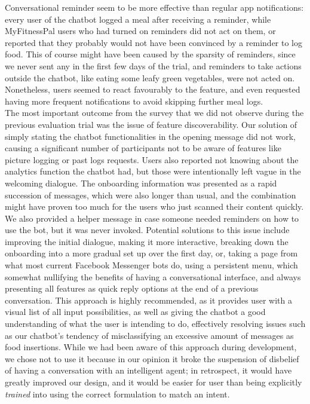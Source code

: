 Conversational reminder seem to be more effective than regular app notifications: every user of the chatbot logged a meal after receiving a reminder, while MyFitnessPal users who had turned on reminders did not act on them, or reported that they probably would not have been convinced by a reminder to log food. This of course might have been caused by the sparsity of reminders, since we never sent any in the first few days of the trial, and reminders to take actions outside the chatbot, like eating some leafy green vegetables, were not acted on. Nonetheless, users seemed to react favourably to the feature, and even requested having more frequent notifications to avoid skipping further meal logs. \\
The most important outcome from the survey that we did not observe during the previous evaluation trial was the issue of feature discoverability. Our solution of simply stating the chatbot functionalities in the opening message did not work, causing a significant number of participants not to be aware of features like picture logging or past logs requests. Users also reported not knowing about the analytics function the chatbot had, but those were intentionally left vague in the welcoming dialogue. The onboarding information was presented as a rapid succession of messages, which were also longer than usual, and the combination might have proven too much for the users who just scanned their content quickly. We also provided a helper message in case someone needed reminders on how to use the bot, but it was never invoked. Potential solutions to this issue include improving the initial dialogue, making it more interactive, breaking down the onboarding into a more gradual set up over the first day, or, taking a page from what most current Facebook Messenger bots do, using a persistent menu, which somewhat nullifying the benefits of having a conversational interface, and always presenting all features as quick reply options at the end of a previous conversation. This approach is highly recommended, as it provides user with a visual list of all input possibilities, as well as giving the chatbot a good understanding of what the user is intending to do, effectively resolving issues such as our chatbot's tendency of misclassifying an excessive amount of messages as food insertions. While we had been aware of this approach during development, we chose not to use it because in our opinion it broke the suspension of disbelief of having a conversation with an intelligent agent; in retrospect, it would have greatly improved our design, and it would be easier for user than being explicitly \textit{trained} into using the correct formulation to match an intent. \\
